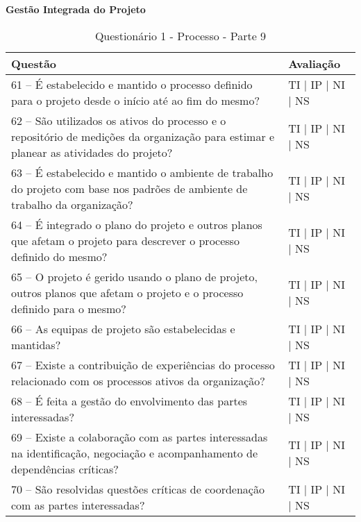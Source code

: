 \documentclass[openany,10pt,a4paper]{article}
\begin{document}
\begin{appendix}
\begin{table}[h]
\textbf{Gestão Integrada do Projeto}
	\centering
	\caption{Questionário 1 - Processo - Parte 9}
	\begin{tabular}{p{3.5in}p{2in}}		
		\toprule
		\textbf{Questão}  & \textbf{Avaliação}\\ 
		\midrule
		61 – É estabelecido e mantido o processo definido para o projeto desde o início até ao fim do mesmo?
 & TI | IP | NI | NS \\
        \midrule
		62 – São utilizados os ativos do processo e o repositório de medições da organização para 
estimar e planear as atividades do projeto?
 & TI | IP | NI | NS \\
		\midrule
		63 – É estabelecido e mantido o ambiente de trabalho do projeto com base nos padrões de 
ambiente de trabalho da organização?
 & TI | IP | NI | NS \\
		\midrule
        64 – É integrado o plano do projeto e outros planos que afetam o projeto para descrever o 
processo definido do mesmo?
 & TI | IP | NI | NS \\
		\midrule
		65 – O projeto é gerido usando o plano de projeto, outros planos que afetam o projeto e o 
processo definido para o mesmo?
  & TI | IP | NI | NS \\
		\midrule
		66 – As equipas de projeto são estabelecidas e mantidas?
 & TI | IP | NI | NS \\
        \midrule
		67 – Existe a contribuição de experiências do processo relacionado com os processos ativos da 
organização?
 & TI | IP | NI | NS \\
        \midrule
		68 – É feita a gestão do envolvimento das partes interessadas?
 & TI | IP | NI | NS \\
        \midrule
		69  – Existe a colaboração com as partes interessadas na identificação, negociação e 
acompanhamento de dependências críticas?
 & TI | IP | NI | NS \\
        \midrule
		70 – São resolvidas questões críticas de coordenação com as partes interessadas?
 & TI | IP | NI | NS \\
		\bottomrule
	\end{tabular} 
	\label{tab:tabela1}
\end{table}


\end{appendix}
\end{document}
